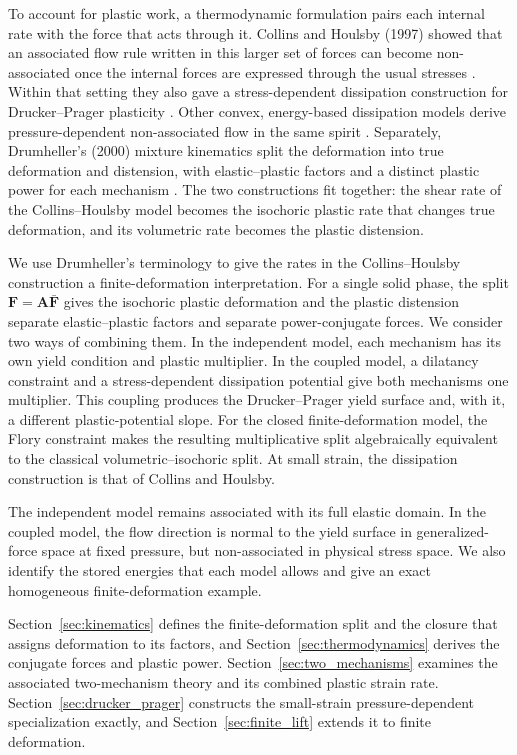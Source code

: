 \documentclass[11pt]{article}
\newcommand{\mbf}[1]{\mathbf{#1}}
\begin{document}
To account for plastic work, a thermodynamic formulation pairs each internal
rate with the force that acts through it.  Collins and Houlsby (1997) showed that an associated flow
rule written in this larger set of forces can become non-associated once the
internal forces are expressed through the usual stresses
\cite[Sec.~5]{collins1997}.  Within that setting they also gave a
stress-dependent dissipation construction for Drucker--Prager plasticity
\cite[Sec.~5]{collins1997}.  Other convex, energy-based dissipation models
derive pressure-dependent non-associated flow in the same spirit
\cite{srinivasa2010,ulloa2021}.  Separately, Drumheller's (2000) mixture kinematics
split the deformation into true deformation and distension, with elastic--plastic
factors and a distinct plastic power for each mechanism
\cite[Secs.~3 and 8]{drumheller2000}.  The two constructions fit together: the
shear rate of the Collins--Houlsby model becomes the isochoric plastic rate
that changes true deformation, and its volumetric rate becomes the plastic
distension.

We use Drumheller's terminology to give the rates in the Collins--Houlsby
construction a finite-deformation interpretation.  For a single solid phase,
the split \(\mbf F=\mbf A\bar{\mbf F}\) gives the isochoric plastic
deformation and the plastic distension separate elastic--plastic factors and
separate power-conjugate forces.  We consider two ways of combining them.  In
the independent model, each mechanism has its own yield condition and plastic
multiplier.  In the coupled model, a dilatancy constraint and a stress-dependent
dissipation potential give both mechanisms one multiplier.
This coupling produces the Drucker--Prager yield surface and, with it, a
different plastic-potential slope.  For the closed finite-deformation model,
the Flory constraint makes the resulting multiplicative split algebraically
equivalent to the classical volumetric--isochoric split.  At small strain, the
dissipation construction is that of Collins and Houlsby.

The independent model remains associated with its full elastic domain. In the
coupled model, the flow direction is normal to the yield surface in
generalized-force space at fixed pressure, but non-associated in physical
stress space. We also identify the stored energies that each model allows and
give an exact homogeneous finite-deformation example.

Section~\ref{sec:kinematics} defines the finite-deformation split and the
closure that assigns deformation to its factors, and
Section~\ref{sec:thermodynamics} derives the conjugate forces and plastic
power.  Section~\ref{sec:two_mechanisms} examines the associated
two-mechanism theory and its combined plastic strain rate.
Section~\ref{sec:drucker_prager}
constructs the small-strain pressure-dependent specialization exactly, and
Section~\ref{sec:finite_lift} extends it to finite deformation.
\end{document}

